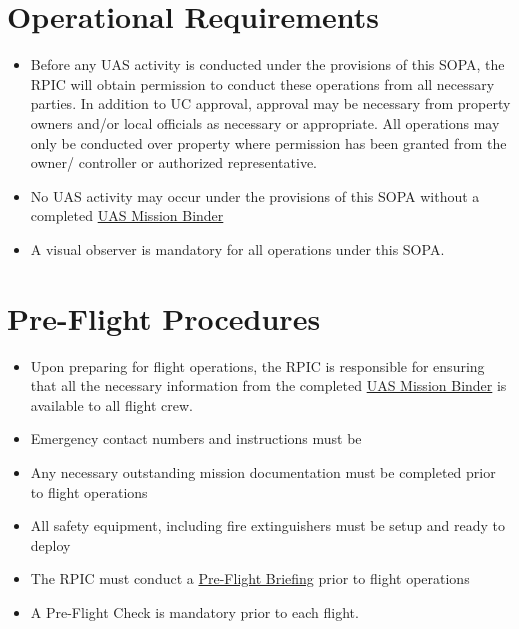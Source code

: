 \documentclass[
]{book}
\providecommand{\tightlist}{%
  \setlength{\itemsep}{0pt}\setlength{\parskip}{0pt}}
\begin{document}
\hypertarget{operational-requirements}{%
\section{Operational Requirements}\label{operational-requirements}}

\begin{itemize}
\tightlist
\item
  Before any UAS activity is conducted under the provisions of this SOPA, the RPIC will obtain permission to conduct these operations from all necessary parties. In addition to UC approval, approval may be necessary from property owners and/or local officials as necessary or appropriate. All operations may only be conducted over property where permission has been granted from the owner/ controller or authorized representative.\\
\item
  No UAS activity may occur under the provisions of this SOPA without a completed \protect\hyperlink{ch-mission-binder}{UAS Mission Binder}
\item
  A visual observer is mandatory for all operations under this SOPA.
\end{itemize}

\hypertarget{pre-flight-procedures}{%
\section{Pre-Flight Procedures}\label{pre-flight-procedures}}

\begin{itemize}
\tightlist
\item
  Upon preparing for flight operations, the RPIC is responsible for ensuring that all the necessary information from the completed \protect\hyperlink{ch-mission-binder}{UAS Mission Binder} is available to all flight crew.
\item
  Emergency contact numbers and instructions must be
\item
  Any necessary outstanding mission documentation must be completed prior to flight operations
\item
  All safety equipment, including fire extinguishers must be setup and ready to deploy
\item
  The RPIC must conduct a \protect\hyperlink{pfb}{Pre-Flight Briefing} prior to flight operations
\item
  A Pre-Flight Check is mandatory prior to each flight.
\end{itemize}
\end{document}
